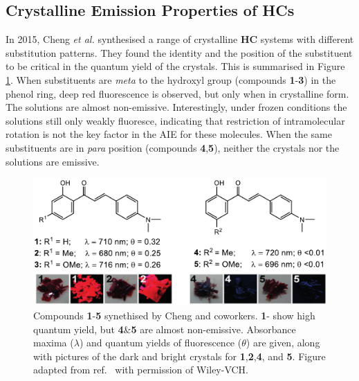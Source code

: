 \subsection{Crystalline Emission Properties of \acp{HC}}
In 2015, Cheng \textit{et al.} synthesised a range of crystalline \textbf{HC} systems with different substitution patterns.\cite{Cheng2015} They found the identity and the position of the substituent to be critical in the quantum yield of the crystals. This is summarised in Figure \ref{figure: HC_experimental}. When substituents are \textit{meta} to  the hydroxyl group (compounds \textbf{1}-\textbf{3}) in the phenol ring, deep red fluorescence is observed, but only when in crystalline form. The solutions are almost non-emissive. Interestingly, under frozen conditions the solutions still only weakly fluoresce, indicating that restriction of intramolecular rotation is not the key factor in the \ac{AIE} for these molecules. When the same substituents are in \textit{para} position (compounds \textbf{4},\textbf{5}), neither the crystals nor the solutions are emissive. 
\begin{figure}[H]
\centering
  \includegraphics[width=0.95\linewidth]{1Intro/HC_experimental.pdf}
  \caption[Emission behaviour of crystalline 2'-hydroxychalcone derivatives]{Compounds \textbf{1}-\textbf{5} synethised by Cheng and coworkers. \textbf{1}-\textbf{} show high quantum yield, but \textbf{4}\&\textbf{5} are almost non-emissive. Absorbance maxima ($\lambda$) and quantum yields of fluorescence ($\theta$) are given, along with pictures of the dark and bright crystals for \textbf{1},\textbf{2},\textbf{4}, and \textbf{5}. Figure adapted from ref.~ with permission of Wiley-VCH.}
  \label{figure: HC_experimental}
\end{figure}
